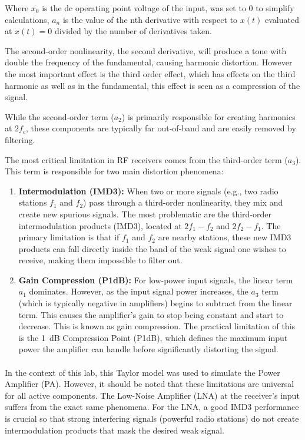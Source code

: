 Where \(x_0\) is the dc operating point voltage of the input, was set to 0 to simplify calculations, \(a_n\) is the value of the nth derivative with respect to \(x(t)\) evaluated at \(x(t) = 0\) divided by the number of derivatives taken.

The second-order nonlinearity, the second derivative, will produce a tone with double the frequency of the fundamental, causing harmonic distortion. However the most important effect is the third order effect, which has effects on the third harmonic as well as in the fundamental, this effect is seen as a compression of the signal.  

While the second-order term ($a_2$) is primarily responsible for creating harmonics at $2f_c$, these components are typically far out-of-band and are easily removed by filtering.

The most critical limitation in RF receivers comes from the third-order term ($a_3$). This term is responsible for two main distortion phenomena:

\begin{enumerate}
    \item \textbf{Intermodulation (IMD3):} When two or more signals (e.g., two radio stations $f_1$ and $f_2$) pass through a third-order nonlinearity, they mix and create new spurious signals. The most problematic are the third-order intermodulation products (IMD3), located at $2f_1 - f_2$ and $2f_2 - f_1$. The primary limitation is that if $f_1$ and $f_2$ are nearby stations, these new IMD3 products can fall directly inside the band of the weak signal one wishes to receive, making them impossible to filter out.
    
    \item \textbf{Gain Compression (P1dB):} For low-power input signals, the linear term $a_1$ dominates. However, as the input signal power increases, the $a_3$ term (which is typically negative in amplifiers) begins to subtract from the linear term. This causes the amplifier's gain to stop being constant and start to decrease. This is known as gain compression. The practical limitation of this is the \SI{1}{\deci\bel} Compression Point (P1dB), which defines the maximum input power the amplifier can handle before significantly distorting the signal.
\end{enumerate}

\paragraph{}
In the context of this lab, this Taylor model was used to simulate the Power Amplifier (PA). However, it should be noted that these limitations are universal for all active components. The Low-Noise Amplifier (LNA) at the receiver's input suffers from the exact same phenomena. For the LNA, a good IMD3 performance is crucial so that strong interfering signals (powerful radio stations) do not create intermodulation products that mask the desired weak signal.


